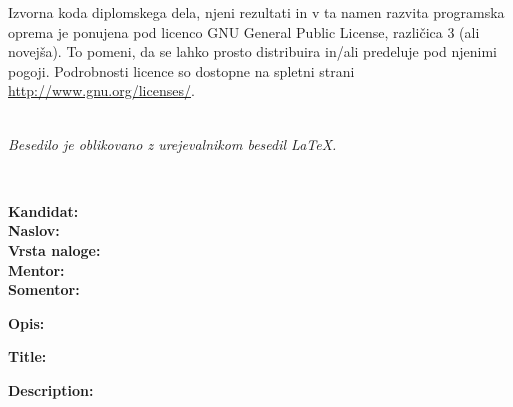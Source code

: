 \vspace*{1cm}
{\small \noindent
  Izvorna koda diplomskega dela, njeni rezultati in v ta namen razvita programska oprema je ponujena pod licenco GNU General Public License,
  različica 3 (ali novejša). To pomeni, da se lahko prosto distribuira in/ali predeluje pod njenimi pogoji.
  Podrobnosti licence so dostopne na spletni strani \url{http://www.gnu.org/licenses/}.
}

\vfill
\begin{center}
  \ \\ \vfill
  {\em
  Besedilo je oblikovano z urejevalnikom besedil \LaTeX.}
\end{center}

\clearemptydoublepage

\thispagestyle{empty}
\
\vfill

\bigskip
\noindent\textbf{Kandidat:} \tauthor\\
\noindent\textbf{Naslov:} \ttitle\\
\noindent\textbf{Vrsta naloge:} \tvrsta \\
\noindent\textbf{Mentor:} \tmentor \\
\noindent\textbf{Somentor:} \tsomentor

\bigskip
\noindent\textbf{Opis:}\\
\tdescription

\bigskip
\noindent\textbf{Title:} \ttitleEn

\bigskip
\noindent\textbf{Description:}\\
\tdescriptionEn

\vfill

\vspace{2cm}

\clearemptydoublepage

\thispagestyle{empty}\mbox{}\vfill\null\it%
\noindent
\tzahvala
\rm\normalfont

\clearemptydoublepage

\thispagestyle{empty}\mbox{}{\textheight}\mbox{}\hfill
\begin{minipage}{0.55\textwidth}%
  \tposvetilo
  \normalfont
\end{minipage}

\clearemptydoublepage

